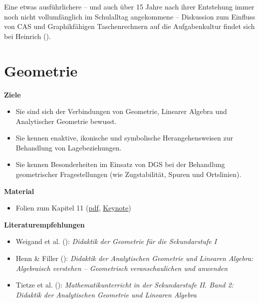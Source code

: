 \documentclass[
]{scrbook}
\providecommand{\tightlist}{%
  \setlength{\itemsep}{0pt}\setlength{\parskip}{0pt}}
\renewenvironment{quote}{
  \list{}{
	\leftmargin0.2cm   %
    \rightmargin\leftmargin
      	\def\FrameCommand
    {%
        {\color{quoteColor}\vrule width 2pt}%
        \hspace{0pt}%
    }%
    \MakeFramed{\advance \hsize -\width \FrameRestore}    \color{quoteColor}
    }
  \item\relax
}
{\endlist\color{black}\endMakeFramed}
\theoremstyle{definition}
\theoremstyle{definition}
\theoremstyle{definition}
\theoremstyle{definition}
\theoremstyle{remark}
\begin{document}
Eine etwas ausführlichere -- und auch über 15 Jahre nach ihrer Entstehung immer noch nicht vollumfänglich im Schulalltag angekommene -- Diskussion zum Einfluss von CAS und Graphikfähigen Taschenrechnern auf die Aufgabenkultur findet sich bei Heinrich ().

\chapter{Geometrie}\label{geometrie}

\begin{quote}
\textbf{Ziele}

\begin{itemize}
\tightlist
\item
  Sie sind sich der Verbindungen von Geometrie, Linearer Algebra und Analytischer Geometrie bewusst.\\
\item
  Sie kennen enaktive, ikonische und symbolische Herangehensweisen zur Behandlung von Lagebeziehungen.\\
\item
  Sie kennen Besonderheiten im Einsatz von DGS bei der Behandlung geometrischer Fragestellungen (wie Zugstabilität, Spuren und Ortslinien).
\end{itemize}

\textbf{Material}

\begin{itemize}
\tightlist
\item
  Folien zum Kapitel 11 (\href{files/Stoffdidaktik2024-11-Geometrie.pdf}{pdf}, \href{files/Stoffdidaktik2024-11-Geometrie.key}{Keynote})
\end{itemize}

\textbf{Literaturempfehlungen}

\begin{itemize}
\tightlist
\item
  Weigand et al. (): \emph{Didaktik der Geometrie für die Sekundarstufe I}
\item
  Henn \& Filler (): \emph{Didaktik der Analytischen Geometrie und Linearen Algebra: Algebraisch verstehen -- Geometrisch veranschaulichen und anwenden}
\item
  Tietze et al. (): \emph{Mathematikunterricht in der Sekundarstufe II. Band 2: Didaktik der Analytischen Geometrie und Linearen Algebra}
\end{itemize}
\end{quote}
\end{document}
